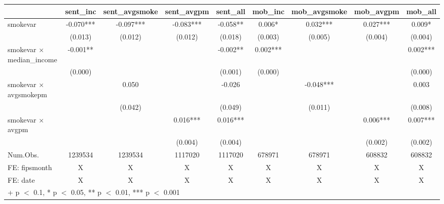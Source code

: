 \begin{table}
\centering
\begin{tabular}[t]{lcccccccc}
\toprule
  & sent\_inc & sent\_avgsmoke & sent\_avgpm & sent\_all & mob\_inc & mob\_avgsmoke & mob\_avgpm & mob\_all\\
\midrule
smokevar & -0.070*** & -0.097*** & -0.083*** & -0.058** & 0.006* & 0.032*** & 0.027*** & 0.009*\\
 & (0.013) & (0.012) & (0.012) & (0.018) & (0.003) & (0.005) & (0.004) & (0.004)\\
smokevar × median\_income & -0.001** &  &  & -0.002** & 0.002*** &  &  & 0.002***\\
 & (0.000) &  &  & (0.001) & (0.000) &  &  & (0.000)\\
smokevar × avgsmokepm &  & 0.050 &  & -0.026 &  & -0.048*** &  & 0.003\\
 &  & (0.042) &  & (0.049) &  & (0.011) &  & (0.008)\\
smokevar × avgpm &  &  & 0.016*** & 0.016*** &  &  & 0.006*** & 0.007***\\
 &  &  & (0.004) & (0.004) &  &  & (0.002) & (0.002)\\
\midrule
Num.Obs. & 1239534 & 1239534 & 1117020 & 1117020 & 678971 & 678971 & 608832 & 608832\\
FE: fipsmonth & X & X & X & X & X & X & X & X\\
FE: date & X & X & X & X & X & X & X & X\\
\bottomrule
\multicolumn{9}{l}{\rule{0pt}{1em}+ p $<$ 0.1, * p $<$ 0.05, ** p $<$ 0.01, *** p $<$ 0.001}\\
\end{tabular}
\end{table}
